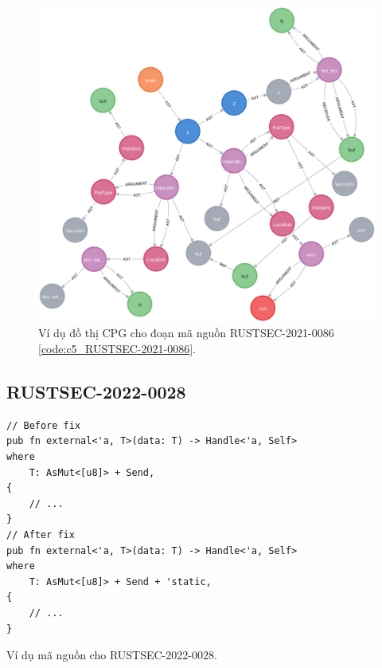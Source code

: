 \begin{figure}[H]
    \includegraphics[width=1\columnwidth]{figures/c5/c5_RUSTSEC-2021-0086}
    \centering
    \caption{Ví dụ đồ thị CPG cho đoạn mã nguồn RUSTSEC-2021-0086 \ref{code:c5_RUSTSEC-2021-0086}.}
    \label{img:c5_RUSTSEC-2021-0086}
\end{figure}

\subsection{RUSTSEC-2022-0028}

\begin{listing}[H]
\begin{verbatim}
// Before fix
pub fn external<'a, T>(data: T) -> Handle<'a, Self>
where
    T: AsMut<[u8]> + Send,
{
    // ...
}
// After fix
pub fn external<'a, T>(data: T) -> Handle<'a, Self>
where
    T: AsMut<[u8]> + Send + 'static,
{
    // ...
}
\end{verbatim}
\caption{Ví dụ mã nguồn cho RUSTSEC-2022-0028.}
\label{code:c5_RUSTSEC-2022-0028}
\end{listing}

